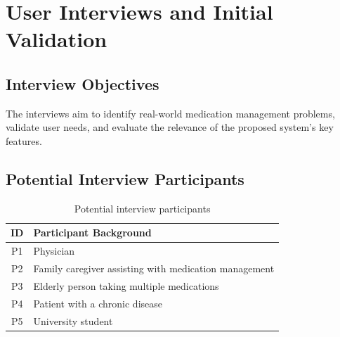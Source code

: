 \section{User Interviews and Initial Validation}

\subsection{Interview Objectives}

The interviews aim to identify real-world medication management problems, validate user needs, and evaluate the relevance of the proposed system's key features.

\subsection{Potential Interview Participants}

\begin{table}[h]
    \centering
    \renewcommand{\arraystretch}{1.3}
    \begin{tabular}{|c|p{10cm}|}
        \hline
        \textbf{ID} & \textbf{Participant Background} \\
        \hline
        P1 & Physician \\
        \hline
        P2 & Family caregiver assisting with medication management \\
        \hline
        P3 & Elderly person taking multiple medications \\
        \hline
        P4 & Patient with a chronic disease \\
        \hline
        P5 & University student \\
        \hline
    \end{tabular}
    \caption{Potential interview participants}
    \label{tab:interview-participants}
\end{table}
